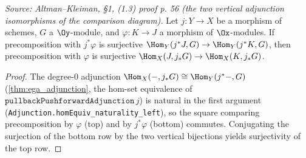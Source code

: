 \begin{lemma}

  \label{lem:adjunction_ladder_surjective}
  \textit{Source: Altman--Kleiman, §1, (1.3) proof p. 56 (the two vertical
  adjunction isomorphisms of the comparison diagram).}
  Let $j : Y \to X$ be a morphism of schemes, $G$ a $\Oy$-module, and
  $\varphi : K \to J$ a morphism of $\Ox$-modules. If precomposition with $j^*\varphi$
  is surjective $\Hom_Y(j^*J, G) \to \Hom_Y(j^*K, G)$, then precomposition with
  $\varphi$ is surjective $\Hom_X(J, j_*G) \to \Hom_X(K, j_*G)$.
  \begin{proof}
    The degree-$0$ adjunction $\Hom_X(-, j_*G) \cong \Hom_Y(j^*-, G)$
    (\cref{thm:ega_adjunction}, the hom-set equivalence of
    $\mathtt{pullbackPushforwardAdjunction}\,j$) is natural in the first argument
    (\texttt{Adjunction.homEquiv\_naturality\_left}), so the square comparing
    precomposition by $\varphi$ (top) and by $j^*\varphi$ (bottom) commutes.
    Conjugating the surjection of the bottom row by the two vertical bijections
    yields surjectivity of the top row.
  \end{proof}
\end{lemma}

